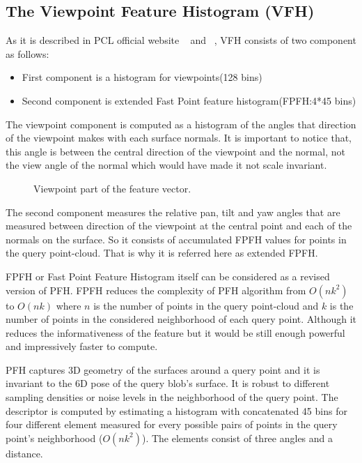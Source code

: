 \subsection{The Viewpoint Feature Histogram (VFH)}
\label{VFH.ssec}

As it is described in PCL official website ~\cite{VFH_Definition} and ~\cite{5651280}, 
VFH consists of two component as follows:

\begin{itemize}
 \item First component is a histogram for viewpoints(128 bins)
 \item Second component is extended Fast Point feature histogram(FPFH:4*45 bins)
\end{itemize}

The viewpoint component is computed as a histogram of the angles that direction of the viewpoint  makes with each surface
normals. 
It is important to notice that, this angle is between the central direction of the viewpoint and the normal, not the view angle of
the normal which would have made it not scale invariant. 

\begin{figure}[t]
  \caption[ViewPoint Component of VFH]
  {Viewpoint part of the feature vector.\cite{VFH_Definition}}
  \label{VFH_ViewPoint_component.figure}
\end{figure}

The second component measures the relative pan, tilt and yaw angles that are measured between direction of the viewpoint  at the 
central point and each of the normals on the surface. 
So it consists of accumulated FPFH values for points in the query point-cloud.
That is why it is referred here as extended FPFH.

FPFH or Fast Point Feature Histogram itself can be considered as a revised version of PFH. FPFH reduces the complexity 
of PFH algorithm from $ O(n k^{2}) $ to $ O(n k) $ where $n$ is the number of points in the query point-cloud and $k$ is 
the number of points in the considered neighborhood of each query point. 
Although it reduces the informativeness of the feature but it would be still enough powerful and impressively faster 
to compute. 

PFH captures 3D geometry of the surfaces around a query point and it is invariant to the 6D pose of the query blob's 
surface. 
It is robust to different sampling densities or noise levels in the neighborhood of the query point. 
The descriptor is computed by estimating a histogram with concatenated 45 bins for four different element measured for every 
possible pairs of points in the query point's neighborhood ($ O(n k^{2}) $). 
The elements consist of three angles and a distance. 

